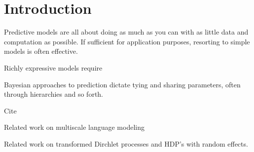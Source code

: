 \section{Introduction}
\label{section_introduction}

Predictive models are all about doing as much as you can with as little data and computation as possible.  If sufficient for application purposes, resorting to simple models is often effective.  

Richly expressive models require   

Bayesian approaches to prediction dictate tying and sharing parameters, often through hierarchies and so forth. 

Cite 

Related work on multiscale language modeling
\citep{Goldwater2009,Mochihashi2009}

Related work on transformed Dirchlet processes and HDP's with random effects.
\citep{Sudderth2005,Kim2007,Hoffman2009,}